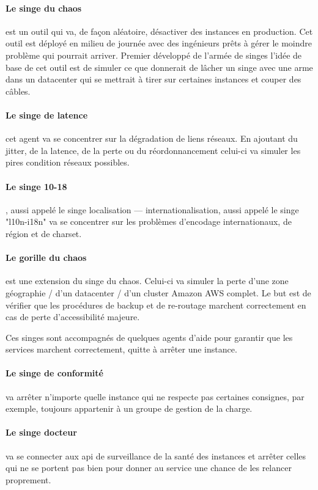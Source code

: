 \documentclass[a4paper]{report}
\begin{document}
\paragraph{Le singe du chaos} est un outil qui va, de façon aléatoire, désactiver des instances en production.
Cet outil est déployé en milieu de journée avec des ingénieurs prêts à gérer le moindre problème qui pourrait arriver.
Premier développé de l'armée de singes l'idée de base de cet outil est de simuler ce que donnerait de lâcher un singe avec une arme dans un datacenter qui se mettrait à tirer sur certaines instances et couper des câbles.

\paragraph{Le singe de latence} cet agent va se concentrer sur la dégradation de liens réseaux.
En ajoutant du jitter, de la latence, de la perte ou du réordonnancement celui-ci va simuler les pires condition réseaux possibles.


\paragraph{Le singe 10-18}, aussi appelé le singe localisation — internationalisation, aussi appelé le singe "l10n-i18n" va se concentrer sur les problèmes d'encodage internationaux, de région et de charset.

\paragraph{Le gorille du chaos} est une extension du singe du chaos. Celui-ci va simuler la perte d'une zone géographie / d'un datacenter / d'un cluster Amazon AWS complet.
Le but est de vérifier que les procédures de backup et de re-routage marchent correctement en cas de perte d'accessibilité majeure.

Ces singes sont accompagnés de quelques agents d'aide pour garantir que les services marchent correctement, quitte à arrêter une instance.

\paragraph{Le singe de conformité} va arrêter n'importe quelle instance qui ne respecte pas certaines consignes, par exemple, toujours appartenir à un groupe de gestion de la charge.

\paragraph{Le singe docteur} va se connecter aux api de surveillance de la santé des instances et arrêter celles qui ne se portent pas bien pour donner au service une chance de les relancer proprement.
\end{document}
